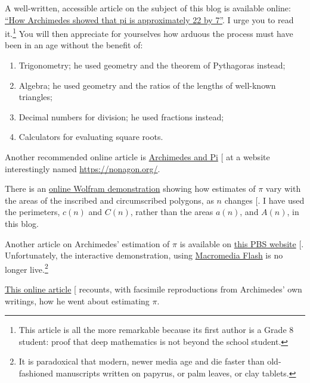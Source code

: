 \documentclass[
  a4paper,
]{article}
\begin{document}
A well-written, accessible article on the subject of this blog is
available online:
\href{https://publications.azimpremjiuniversity.edu.in/3356/1/02-DaminiAndAbhishek_PiIs22By7_Final.pdf}{``How
Archimedes showed that pi is approximately 22 by 7''}. I urge you to
read it.\footnote{This article is all the more remarkable because its
  first author is a Grade 8 student: proof that deep mathematics is not
  beyond the school student.} You will then appreciate for yourselves
how arduous the process must have been in an age without the benefit of:

\begin{enumerate}
\item
  Trigonometry; he used geometry and the theorem of Pythagoras instead;
\item
  Algebra; he used geometry and the ratios of the lengths of well-known
  triangles;
\item
  Decimal numbers for division; he used fractions instead;
\item
  Calculators for evaluating square roots.
\end{enumerate}

Another recommended online article is
\href{https://nonagon.org/ExLibris/archimedes-pi}{Archimedes and Pi}
{[}\citeproc{ref-bertrand2014}{2}{]} at a website interestingly named
\href{https://nonagon.org/}{\textsf{https://nonagon.org/}}.

There is an
\href{https://demonstrations.wolfram.com/ArchimedesApproximationOfPi/\#more}{online
Wolfram demonstration} showing how estimates of \(\pi\) vary with the
areas of the inscribed and circumscribed polygons, as \(n\) changes
{[}\citeproc{ref-tucker2009}{11}{]}. I have used the perimeters,
\(c(n)\) and \(C(n)\), rather than the areas \(a(n)\), and \(A(n)\), in
this blog.

Another article on Archimedes' estimation of \(\pi\) is available on
\href{ttps://www.pbs.org/wgbh/nova/physics/approximating-pi.html}{this
PBS website} {[}\citeproc{ref-groleau2003}{12}{]}. Unfortunately, the
interactive demonstration, using
\href{https://en.wikipedia.org/wiki/Adobe_Flash}{Macromedia Flash} is no
longer live.\footnote{It is paradoxical that modern, newer media age and
  die faster than old-fashioned manuscripts written on papyrus, or palm
  leaves, or clay tablets.}

\href{https://mathsciencehistory.com/2019/10/01/archimedes-and-his-pi-the-great-numerical-hope/}{This
online article} {[}\citeproc{ref-birchak2019}{13}{]} recounts, with
facsimile reproductions from Archimedes' own writings, how he went about
estimating \(\pi\).
\end{document}
